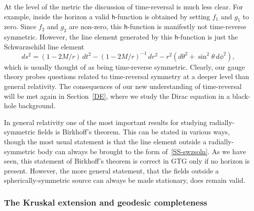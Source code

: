 \documentclass[a4paper]{article}
\numberwithin{equation}{section}
\newcommand{\lih}{\mathsf{h}}
\begin{document}
At the level of the metric the discussion of time-reversal is much
less clear.  For example, inside the horizon a valid $\lih$-function is
obtained by setting $f_1$ and $g_1$ to zero.  Since $f_2$ and $g_2$
are non-zero, this $\lih$-function is manifestly not time-reverse
symmetric.  However, the line element generated by this $\lih$-function
is just the Schwarzschild line element
%
\begin{equation}
ds^2 = (1-2M/r) \,dt^2 - (1-2M/r)^{-1}\, dr^2 - r^2 (d\theta^2 +
\sin^2\theta \, d\phi^2),
\label{SS-swzsoln}
\end{equation}
%
which is usually thought of as being time-reverse symmetric.  Clearly,
our gauge theory probes questions related to time-reversal symmetry at
a deeper level than general relativity.  The consequences of our new
understanding of time-reversal will be met again in Section~\ref{DE},
where we study the Dirac equation in a black-hole background.


In general relativity one of the most important results for studying
radially-symmetric fields is Birkhoff's theorem.  This can be stated
in various ways, though the most usual statement is that the line
element outside a radially-symmetric body can always be brought to the
form of~\eqref{SS-swzsoln}.  As we have seen, this statement of
Birkhoff's theorem is correct in GTG only if no horizon is present.
However, the more general statement, that the fields outside a
spherically-symmetric source can always be made stationary, does
remain valid.


\subsubsection*{The Kruskal extension and geodesic completeness} 
\end{document}
